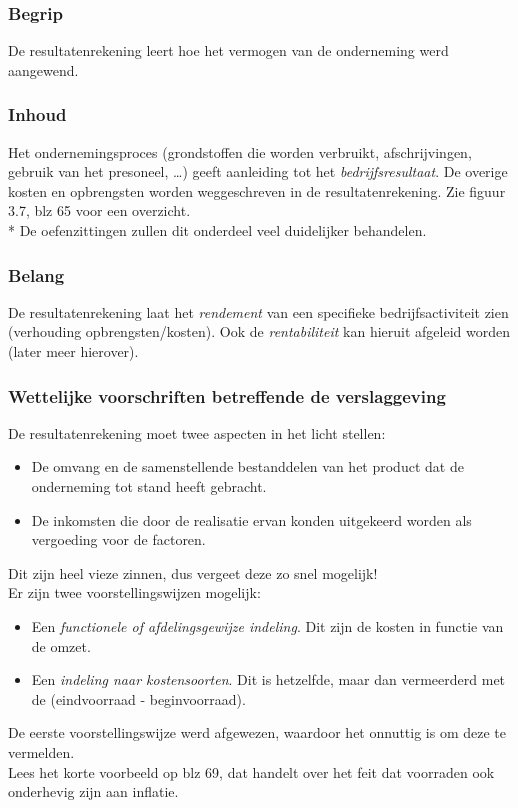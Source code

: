 \documentclass[12pt]{article}
\begin{document}
\subsubsection{Begrip}
De resultatenrekening leert hoe het vermogen van de onderneming werd aangewend.
\subsubsection{Inhoud}
Het ondernemingsproces (grondstoffen die worden verbruikt, afschrijvingen, gebruik van het presoneel, \dots) geeft aanleiding tot het \textit{bedrijfsresultaat}. De overige kosten en opbrengsten worden weggeschreven in de resultatenrekening. Zie figuur 3.7, blz 65 voor een overzicht.\\*
De oefenzittingen zullen dit onderdeel veel duidelijker behandelen.
\subsubsection{Belang}
De resultatenrekening laat het \textit{rendement} van een specifieke bedrijfsactiviteit zien (verhouding opbrengsten/kosten). Ook de \textit{rentabiliteit} kan hieruit afgeleid worden (later meer hierover).
\subsubsection{Wettelijke voorschriften betreffende de verslaggeving}
De resultatenrekening moet twee aspecten in het licht stellen:
\begin{itemize}
\item De omvang en de samenstellende bestanddelen van het product dat de onderneming tot stand heeft gebracht.
\item De inkomsten die door de realisatie ervan konden uitgekeerd worden als vergoeding voor de factoren.
\end{itemize}
Dit zijn heel vieze zinnen, dus vergeet deze zo snel mogelijk!\\
Er zijn twee voorstellingswijzen mogelijk:
\begin{itemize}
\item Een \textit{functionele of afdelingsgewijze indeling}. Dit zijn de kosten in functie van de omzet.
\item Een \textit{indeling naar kostensoorten}. Dit is hetzelfde, maar dan vermeerderd met de (eindvoorraad - beginvoorraad).
\end{itemize}
De eerste voorstellingswijze werd afgewezen, waardoor het onnuttig is om deze te vermelden.\\
Lees het korte voorbeeld op blz 69, dat handelt over het feit dat voorraden ook onderhevig zijn aan inflatie.
\clearpage
\end{document}
